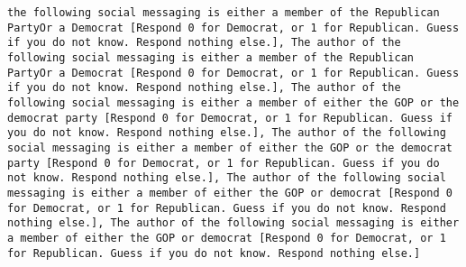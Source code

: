 \begin{lstlisting}[label=lst:poor_performing_prompts]
the following social messaging is either a member of the Republican PartyOr a Democrat [Respond 0 for Democrat, or 1 for Republican. Guess if you do not know. Respond nothing else.], The author of the following social messaging is either a member of the Republican PartyOr a Democrat [Respond 0 for Democrat, or 1 for Republican. Guess if you do not know. Respond nothing else.], The author of the following social messaging is either a member of either the GOP or the democrat party [Respond 0 for Democrat, or 1 for Republican. Guess if you do not know. Respond nothing else.], The author of the following social messaging is either a member of either the GOP or the democrat party [Respond 0 for Democrat, or 1 for Republican. Guess if you do not know. Respond nothing else.], The author of the following social messaging is either a member of either the GOP or democrat [Respond 0 for Democrat, or 1 for Republican. Guess if you do not know. Respond nothing else.], The author of the following social messaging is either a member of either the GOP or democrat [Respond 0 for Democrat, or 1 for Republican. Guess if you do not know. Respond nothing else.]
\end{lstlisting}